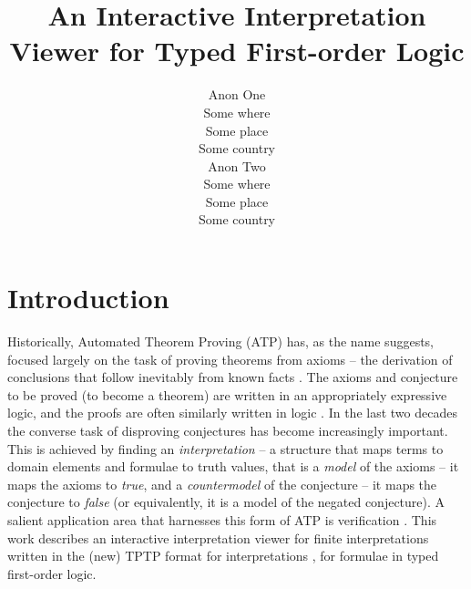 \documentclass[letterpaper]{article}
\begin{document}
\title{An Interactive Interpretation Viewer for Typed First-order Logic}
\author{Anon One\\
Some where\\
Some place\\
Some country\\
\And
Anon Two\\
Some where\\
Some place\\
Some country}

\maketitle
\section{Introduction}
\label{Introduction}

Historically, Automated Theorem Proving (ATP) has, as the name suggests, focused largely on the 
task of proving theorems from axioms -- the derivation of conclusions that follow inevitably from 
known facts \cite{RV01-HAR}.
The axioms and conjecture to be proved (to become a theorem) are written in an 
appropriately expressive logic, and the proofs are often similarly written in logic \cite{SS+06}.
In the last two decades the converse task of disproving conjectures has become increasingly 
important.
This is achieved by finding an {\em interpretation} -- a structure that maps terms to domain 
elements and formulae to truth values, that is a {\em model} of the axioms -- it maps the axioms to 
{\em true}, and a {\em countermodel} of the conjecture -- it maps the conjecture to {\em false}
(or equivalently, it is a model of the negated conjecture).
A salient application area that harnesses this form of ATP is verification \cite{DKW08}.
This work describes an interactive interpretation viewer for finite interpretations 
written in the (new) TPTP format for interpretations \cite{SS+22-FLAIRS}, for formulae in
typed first-order logic.
\end{document}

